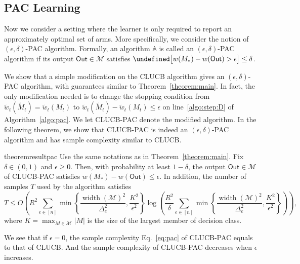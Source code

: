 \documentclass{article}
\newcommand{\Algorithm}{{\small \textsf{CLUCB}}\xspace}
\newcommand{\AlgorithmPAC}{{\small \textsf{CLUCB-PAC}}\xspace}
\newcommand{\M}{\mathcal M}
\DeclareMathOperator{\rank}{width}
\newcommand{\out}{\mathsf{Out}}
\let\Pr\undefined
\DeclareMathOperator{\Pr}{Pr}
\begin{document}
\subsection{PAC Learning}
Now we consider a setting where the learner is only required to report an approximately optimal set of arms. 
More specifically, we consider the notion of $(\epsilon,\delta)$-PAC algorithm.
Formally, an algorithm $\mathbb A$ is called an $(\epsilon,\delta)$-PAC algorithm if its output $\out\in \M$ satisfies $\Pr\big[w(M_*)-w(\out) > \epsilon\big] \le \delta$.

We show that a simple modification on the \Algorithm algorithm gives an $(\epsilon,\delta)$-PAC algorithm, with guarantees similar  to Theorem~\ref{theorem:main}.
In fact, the only modification needed is to change the stopping condition from $\tilde w_t(\tilde M_t) = \tilde w_t(M_t)$ to $\tilde w_t(\tilde M_t)-\tilde w_t(M_t) \le \epsilon$ on line~\ref{algo:step:D} of Algorithm~\ref{algo:pac}.
We let  \AlgorithmPAC denote the modified algorithm.
In the following theorem, we show that \AlgorithmPAC is indeed an $(\epsilon,\delta)$-PAC algorithm and has sample complexity similar to \Algorithm.
\begin{restatable}{theorem}{resultpac}
Use the same notations as in Theorem~\ref{theorem:main}.
Fix $\delta\in(0,1)$ and $\epsilon \ge 0$.
Then, with probability at least $1-\delta$, the output $\out \in \M$ of \AlgorithmPAC satisfies
$
w(M_*)-w(\out) \le \epsilon.
$
In addition, the number of samples $T$ used by the algorithm satisfies
\begin{equation}
T \le 
O\left(R^2\sum_{e\in [n]} \min\left\{\frac{\rank(\M)^2}{\Delta_e^2}, \frac{K^2}{\epsilon^2}\right\} 
\log\left(\frac{R^2}\delta \sum_{e\in [n]} \min\left\{\frac{\rank(\M)^2}{\Delta_e^2}, \frac{K^2}{\epsilon^2}\right\}\right)\right),
\label{eq:pac}
\end{equation}
where $K=\max_{M\in \M} |M|$ is the size of the largest member of decision class.
\label{theorem:pac}
\end{restatable}
We see that if $\epsilon=0$, the sample complexity Eq.~\eqref{eq:pac} of \AlgorithmPAC equals to that of \Algorithm. 
And the sample complexity of \AlgorithmPAC decreases when $\epsilon$ increases.
\end{document}
